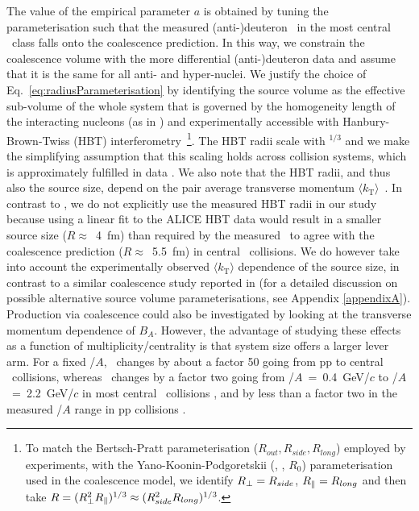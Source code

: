 \documentclass[%
 reprint,
 amsmath,amssymb,
 aps,
]{revtex4-1}
\begin{document}
The value of the empirical parameter $a$ is obtained by tuning the parameterisation such that the measured (anti-)deuteron \btwo~in the most central \PbPb~class falls onto the coalescence prediction. 
In this way, we constrain the coalescence volume with the more differential (anti-)deuteron data and assume that it is the same for all anti- and hyper-nuclei. 
We justify the choice of Eq.~\ref{eq:radiusParameterisation} by identifying the source volume as the effective sub-volume of the whole system that is governed by the homogeneity length of the interacting nucleons (as in \cite{Scheibl:1998tk}) and experimentally accessible with Hanbury-Brown-Twiss (HBT) interferometry~\footnote{To match the Bertsch-Pratt parameterisation ($R_{out}, R_{side}, R_{long}$) employed by experiments, with the Yano-Koonin-Podgoretskii (\rperp, \rpar, $R_{0}$) parameterisation used in the coalescence model,  we identify $R_{\perp} = R_{side}$, $R_{\|} = R_{long}$ and then take $R = (R_{\perp}^{2}R_{\|})^{1/3} \approx (R_{side}^{2}R_{long})^{1/3}$.}.
The HBT radii scale with \avdNdeta$^{1/3}$ and we make the simplifying assumption that this scaling holds across collision systems, which is approximately fulfilled in data \cite{Adam:2015vna,Adam:2015pya}. 
We also note that the HBT radii, and thus also the source size, depend on the pair average transverse momentum $\langle k_{\mathrm{T}}\rangle$~\cite{Aamodt:2011mr}. 
In contrast to \cite{Blum:2017qnn}, we do not explicitly use the measured HBT radii in our study because using a linear fit to the ALICE HBT data \cite{Abelev:2012sq,Adam:2015vna} would result in a smaller source size ($R \approx$~4~fm) than required by the measured \btwo~to agree with the coalescence prediction ($R \approx$~5.5~fm) in central \PbPb~collisions.
We do however take into account the experimentally observed $\langle k_{\mathrm{T}}\rangle$ dependence of the source size, in contrast to a similar coalescence study reported in \cite{Sun:2018mqq} (for a detailed discussion on possible alternative source volume parameterisations, see Appendix \ref{appendixA}). 
%
Production via coalescence could also be investigated by looking at the transverse momentum dependence of $B_{A}$. However, 
the advantage of studying these effects as a function of multiplicity/centrality is that system size offers a larger lever arm. 
For a fixed \pt/$A$, \btwo~changes by about a factor 50 going from pp to central \PbPb~collisions, whereas \btwo~changes by a factor two going from \pt/$A$~=~0.4~GeV/$c$ to \pt/$A$~=~2.2~GeV/$c$  in most central \PbPb~collisions \cite{ALICE:deuteronppPbPb2015}, and by less than a factor two in the measured \pt/$A$ range in pp collisions \cite{ALICE:nucleipp2017, Acharya:2019rgc}.
\end{document}
